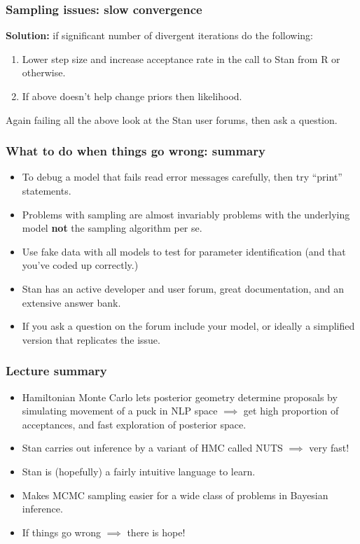 \documentclass[handout]{beamer}
\begin{document}
\begin{frame}
	\frametitle{Sampling issues: slow convergence}
	
	\textbf{Solution:} if significant number of divergent iterations do the following:
	\begin{enumerate}
		\item<3-> Lower step size and increase acceptance rate in the call to Stan from R or otherwise.
		\item<4-> If above doesn't help change priors then likelihood.
	\end{enumerate}
	
	Again failing all the above look at the Stan user forums, then ask a question.
	
\end{frame}

\begin{frame}
	\frametitle{What to do when things go wrong: summary}
	
	\begin{itemize}
		\item<2-> To debug a model that fails read error messages carefully, then try ``print'' statements.
		\item<3-> Problems with sampling are almost invariably problems with the underlying model \textbf{not} the sampling algorithm per se.
		\item<4-> Use fake data with all models to test for parameter identification (and that you've coded up correctly.)
		\item<5-> Stan has an active developer and user forum, great documentation, and an extensive answer bank.
		\item<6-> If you ask a question on the forum include your model, or ideally a simplified version that replicates the issue.
	\end{itemize}
	
\end{frame}

\begin{frame}
	\frametitle{Lecture summary}
	\begin{itemize}
		\item<2-> Hamiltonian Monte Carlo lets posterior geometry determine proposals by simulating movement of a puck in NLP space $\implies$ get high proportion of acceptances, and fast exploration of posterior space.
		\item<3-> Stan carries out inference by a variant of HMC called NUTS $\implies$ very fast!
		\item<4-> Stan is (hopefully) a fairly intuitive language to learn.
		\item<5-> Makes MCMC sampling easier for a wide class of problems in Bayesian inference.
		\item<6-> If things go wrong $\implies$ there is hope!
	\end{itemize}
	
\end{frame}
\end{document}
